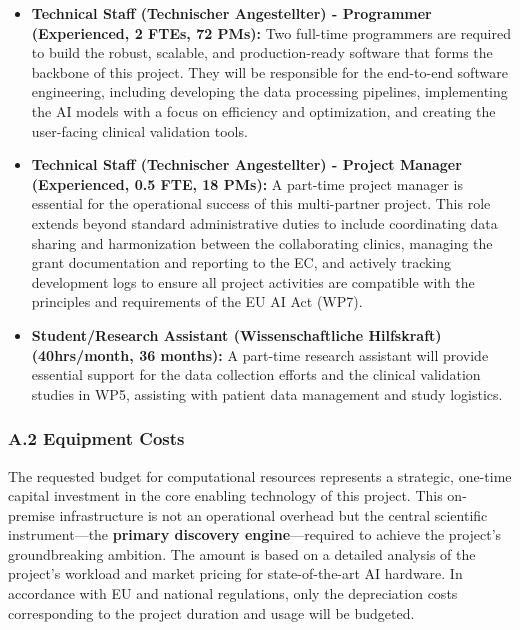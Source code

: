 \documentclass[11pt, a4paper]{article}
\begin{document}
\begin{itemize}
    \item \textbf{Technical Staff (Technischer Angestellter) - Programmer (Experienced, 2 FTEs, 72 PMs):} Two full-time programmers are required to build the robust, scalable, and production-ready software that forms the backbone of this project. They will be responsible for the end-to-end software engineering, including developing the data processing pipelines, implementing the AI models with a focus on efficiency and optimization, and creating the user-facing clinical validation tools.
    \item \textbf{Technical Staff (Technischer Angestellter) - Project Manager (Experienced, 0.5 FTE, 18 PMs):} A part-time project manager is essential for the operational success of this multi-partner project. This role extends beyond standard administrative duties to include coordinating data sharing and harmonization between the collaborating clinics, managing the grant documentation and reporting to the EC, and actively tracking development logs to ensure all project activities are compatible with the principles and requirements of the EU AI Act (WP7).
    \item \textbf{Student/Research Assistant (Wissenschaftliche Hilfskraft) (40hrs/month, 36 months):} A part-time research assistant will provide essential support for the data collection efforts and the clinical validation studies in WP5, assisting with patient data management and study logistics.
\end{itemize}

\subsubsection*{A.2 Equipment Costs}
The requested budget for computational resources represents a strategic, one-time capital investment in the core enabling technology of this project. This on-premise infrastructure is not an operational overhead but the central scientific instrument—the \textbf{primary discovery engine}—required to achieve the project's groundbreaking ambition. The amount is based on a detailed analysis of the project's workload and market pricing for state-of-the-art AI hardware. In accordance with EU and national regulations, only the depreciation costs corresponding to the project duration and usage will be budgeted.
\end{document}
